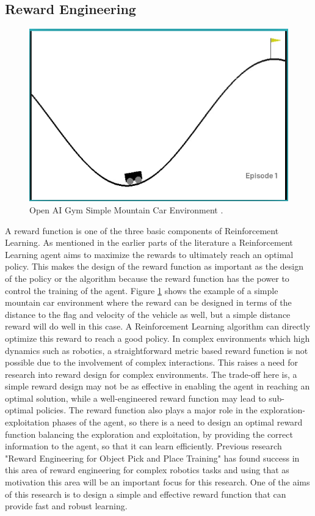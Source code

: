 \subsection{Reward Engineering}

\begin{figure}[h!]
    \centering
    \includegraphics[width=\textwidth]{images/MC.png}
    \caption{Open AI Gym Simple Mountain Car Environment \cite{brockman2016openai}. }
    \label{fig:MC}
\end{figure}

A reward function is one of the three basic components of Reinforcement Learning. As mentioned in the earlier parts of the literature a Reinforcement Learning agent aims to maximize the rewards to ultimately reach an optimal policy. This makes the design of the reward function as important as the design of the policy or the algorithm because the reward function has the power to control the training of the agent. Figure \ref{fig:MC} shows the example of a simple mountain car environment where the reward can be designed in terms of the distance to the flag and velocity of the vehicle as well, but a simple distance reward will do well in this case. A Reinforcement Learning algorithm can directly optimize this reward to reach a good policy. In complex environments which high dynamics such as robotics, a straightforward metric based reward function is not possible due to the involvement of complex interactions. This raises a need for research into reward design for complex environments. The trade-off here is, a simple reward design may not be as effective in enabling the agent in reaching an optimal solution, while a well-engineered reward function may lead to sub-optimal policies. The reward function also plays a major role in the exploration-exploitation phases of the agent, so there is a need to design an optimal reward function balancing the exploration and exploitation, by providing the correct information to the agent, so that it can learn efficiently. Previous research "Reward Engineering for Object Pick and Place Training" \cite{nagpal2020reward} has found success in this area of reward engineering for complex robotics tasks and using that as motivation this area will be an important focus for this research. One of the aims of this research is to design a simple and effective reward function that can provide fast and robust learning. \\

